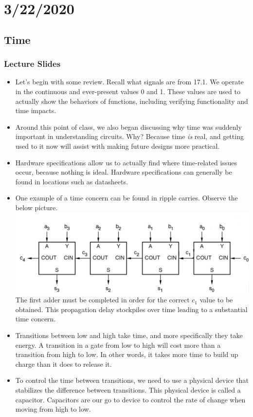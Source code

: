 \documentclass[10pt,a4paper]{article}
\begin{document}
\section{3/22/2020}
\subsection{Time}
\subsubsection{Lecture Slides}
\begin{itemize}
\item Let's begin with some review. Recall what signals are from 17.1. We operate in the continuous and ever-present values 0 and 1. These values are used to actually show the behaviors of functions, including verifying functionality and time impacts.
\item Around this point of class, we also began discussing why time was suddenly important in understanding circuits. Why? Because time \textit{is} real, and getting used to it now will assist with making future designs more practical.
\item Hardware specifications allow us to actually find where time-related issues occur, because nothing is ideal. Hardware specifications can generally be found in locations such as datasheets.
\item One example of a time concern can be found in ripple carries. Observe the below picture.\\
\includegraphics[scale=.7]{IMG6}\\
The first adder must be completed in order for the correct $c_1$ value to be obtained. This propagation delay stockpiles over time leading to a substantial time concern. \\
\item Transitions between low and high take time, and more specifically they take energy. A transition in a gate from low to high will cost more than a transition from high to low. In other words, it takes more time to build up charge than it does to release it. 
\item To control the time between transitions, we need to use a physical device that stabilizes the difference between transitions. This physical device is called a capacitor. Capacitors are our go to device to control the rate of change when moving from high to low. 
\end{itemize}
\end{document}
